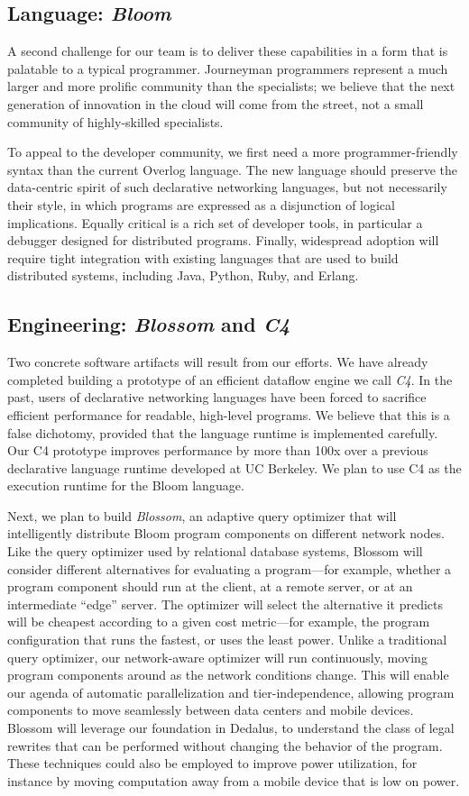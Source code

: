 \subsection{Language: \emph{Bloom}}
A second challenge for our team is to deliver these capabilities in a form that
is palatable to a typical programmer.  Journeyman programmers represent a much
larger and more prolific community than the specialists; we believe that the
next generation of innovation in the cloud will come from the street, not a
small community of highly-skilled specialists.

To appeal to the developer community, we first need a more
programmer-friendly syntax than the current Overlog language. 
The new language should preserve the data-centric spirit of such
declarative networking languages, but not necessarily their style,
in which programs are expressed as a disjunction of logical implications.
Equally
critical is a rich set of developer tools, in particular a debugger
designed for distributed programs.  Finally, widespread adoption will
require tight integration with existing languages that are used to
build distributed systems, including Java, Python, Ruby, and Erlang.

\subsection{Engineering: \emph{Blossom} and \emph{C4}}
Two concrete software artifacts will result from our efforts. 
We have already completed building a prototype of an efficient dataflow
engine we call \emph{C4}. In the past, users of declarative networking
languages have been forced to sacrifice efficient performance for
readable, high-level programs. We believe that this is a false
dichotomy, provided that the language runtime is implemented
carefully. Our C4 prototype improves performance by more than
100x over a previous declarative language runtime developed at UC
Berkeley. We plan to use C4 as the execution runtime for the Bloom
language. 

Next, we plan to
build \emph{Blossom}, an adaptive query optimizer that will intelligently
distribute Bloom program components on different network nodes. Like the query
optimizer used by relational database systems, Blossom will consider different
alternatives for evaluating a program---for example, whether a program component
should run at the client, at a remote server, or at an intermediate ``edge''
server. The optimizer will select the alternative it predicts will be cheapest
according to a given cost metric---for example, the program configuration that
runs the fastest, or uses the least power. Unlike a traditional query optimizer,
our network-aware optimizer will run continuously, moving program components
around as the network conditions change. This will enable our agenda of
automatic parallelization and tier-independence, allowing program components to
move seamlessly between data centers and mobile devices. Blossom will leverage
our foundation in Dedalus, to understand the class of legal rewrites that can be
performed without changing the behavior of the program. These techniques could
also be employed to improve power utilization, for instance by moving
computation away from a mobile device that is low on power.


